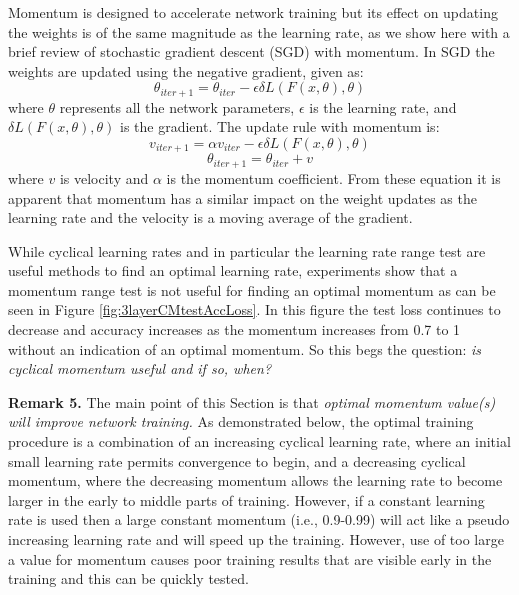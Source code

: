 \documentclass{article} %
\begin{document}
Momentum is designed to accelerate network training but its effect on updating the weights is of the same magnitude as the learning rate, as we show here with a brief review of stochastic gradient descent (SGD) with momentum.
In SGD the weights are updated using the negative gradient, given as:
\begin{equation}
\theta_{iter+1} = \theta_{iter} - \epsilon \delta L(F(x,\theta), \theta)
\end{equation}
where $\theta$ represents all the network parameters, $\epsilon$ is the learning rate, and $\delta L(F(x,\theta), \theta)$ is the gradient.  The update rule with momentum is:
\begin{equation}
v_{iter+1} = \alpha v_{iter} - \epsilon \delta L(F(x,\theta), \theta)
\end{equation}
\begin{equation}
\theta_{iter+1} = \theta_{iter} + v
\end{equation}
where $v$ is velocity and $\alpha$ is the momentum coefficient.  From these equation it is apparent that momentum has a similar impact on the weight updates as the learning rate and the velocity is a moving average of the gradient.  


While cyclical learning rates and in particular the learning rate range test \citep{smith2017cyclical} are useful methods to find an optimal learning rate, experiments show that a momentum range test is not useful for finding an optimal momentum as can be seen in Figure \ref{fig:3layerCMtestAccLoss}.  In this figure the test loss continues to decrease and accuracy increases as the momentum increases from 0.7 to 1 without an indication of an optimal momentum.  So this begs the question:  \emph{is cyclical momentum useful and if so, when?} 

\textbf{Remark 5.}
The main point of this Section is that \emph{optimal momentum value(s) will improve network training. }  As demonstrated below, the optimal training procedure is a combination of an increasing cyclical learning rate, where an initial small learning rate permits convergence to begin,  and a decreasing cyclical momentum, where the decreasing momentum allows the learning rate to become larger in the early to middle parts of training.  However, if a constant learning rate is used then a large constant momentum (i.e., 0.9-0.99) will act like a pseudo increasing learning rate and will speed up the training.  However, use of too large a value for momentum causes poor training results that are visible early in the training and this can be quickly tested. 
\end{document}

